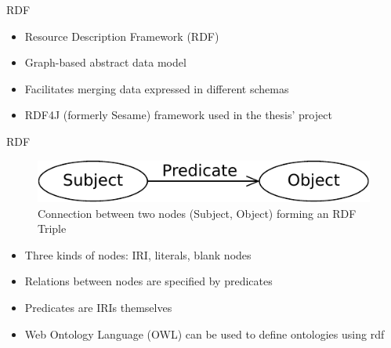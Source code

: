 \begin{frame}{RDF}
    \begin{itemize}
    \item Resource Description Framework (RDF) \cite{rdf11concepts}
    \item Graph-based abstract data model 
	\item Facilitates merging data expressed in different schemas
    \item RDF4J (formerly Sesame) framework used in the thesis' project \cite{RDF4J}
    \end{itemize}
\end{frame}

\begin{frame} {RDF}
\begin{figure}[H]
	\begin{center}
		\includegraphics[scale=0.75]{figures/rdf-graph.pdf}
	\end{center}
	\caption{Connection between two nodes (Subject, Object) forming an RDF Triple
	\footnotemark
	}
	\label{RdfTriple}
\end{figure}
\begin{itemize}
	\item Three kinds of nodes: IRI, literals, blank nodes
    \item Relations between nodes are specified by predicates 
    \item Predicates are IRIs themselves
    \item Web Ontology Language (OWL) can be used to define ontologies using rdf \cite{owlSpec}
\end{itemize}

\end{frame}

